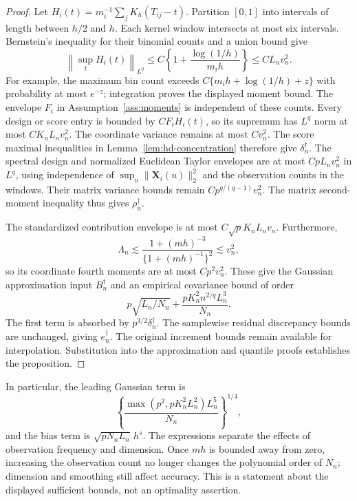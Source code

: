 \documentclass[10pt]{book}
\newcommand{\bX}{{\mathbf X}}
\numberwithin{equation}{section}
\begin{document}
\begin{proof}
Let $H_i(t)=m_i^{-1}\sum_jK_h(T_{ij}-t)$.
Partition $[0,1]$ into intervals of length between $h/2$ and $h$.
Each kernel window intersects at most six intervals. Bernstein's inequality
for their binomial counts and a union bound give
\[
\left\|\sup_t H_i(t)\right\|_{L^q}
\le C\left\{1+\frac{\log(1/h)}{m_i h}\right\}
\le CL_n v_n^2.
\]
For example, the maximum bin count exceeds
$C\{m_i h+\log(1/h)+z\}$ with probability at most $e^{-z}$;
integration proves the displayed moment bound.
The envelope $F_i$ in Assumption~\ref{ass:moments} is independent of these
counts. Every design or score entry is bounded by $CF_i H_i(t)$, so its
supremum has $L^q$ norm at most $CK_nL_n v_n^2$.
The coordinate variance remains at most $Cv_n^2$.
The score maximal inequalities in Lemma~\ref{lem:hd-concentration}
therefore give $\delta_n^\dagger$. The spectral design and normalized
Euclidean Taylor envelopes are at most $CpL_n v_n^2$ in $L^q$,
using independence of $\sup_u\|\bX_i(u)\|_2^2$ and the observation
counts in the windows. Their matrix variance bounds remain
$Cp^{q/(q-1)}v_n^2$.
The matrix second-moment inequality thus gives $\rho_n^\dagger$.

The standardized contribution envelope is at most
$C\sqrt pK_nL_n v_n$. Furthermore,
\[
\Lambda_n\lesssim
\frac{1+(mh)^{-3}}{\{1+(mh)^{-1}\}^2}\lesssim v_n^2,
\]
so its coordinate fourth moments are at most $Cp^2v_n^2$.
These give the Gaussian approximation input $B_n^\dagger$ and
an empirical covariance bound of order
\[
p\sqrt{L_n/N_n}+\frac{pK_n^2n^{2/q}L_n^3}{N_n}.
\]
The first term is absorbed by $p^{3/2}\delta_n^\dagger$.
The samplewise residual discrepancy bounds are unchanged, giving
$e_n^\dagger$. The original increment
bounds remain available for interpolation. Substitution into the approximation and quantile proofs
establishes the proposition.
\end{proof}

In particular, the leading Gaussian term is
\[
\left\{\frac{\max(p^2,pK_n^2L_n^2)L_n^5}{N_n}\right\}^{1/4},
\]
and the bias term is $\sqrt{pN_nL_n}\,h^s$.
The expressions separate the effects of observation frequency and dimension.
Once $mh$ is bounded away from zero, increasing the observation count no
longer changes the polynomial order of $N_n$; dimension and smoothing still
affect accuracy. This is a statement about the displayed sufficient bounds,
not an optimality assertion.
\end{document}
